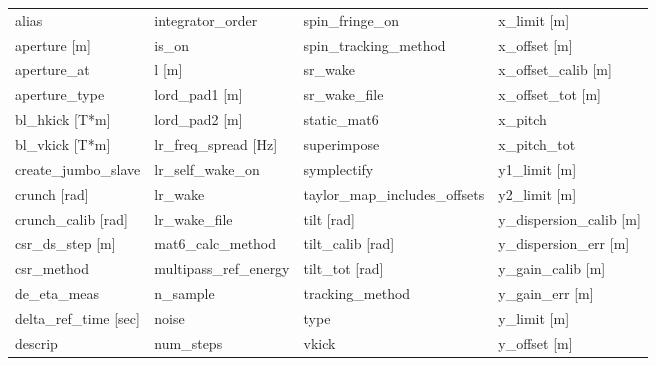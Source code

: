  \begin{tabular}{llll} \toprule
alias                            & integrator_order                 & spin_fringe_on                   & x_limit [m]                      \\
aperture [m]                     & is_on                            & spin_tracking_method             & x_offset [m]                     \\
aperture_at                      & l [m]                            & sr_wake                          & x_offset_calib [m]               \\
aperture_type                    & lord_pad1 [m]                    & sr_wake_file                     & x_offset_tot [m]                 \\
bl_hkick [T*m]                   & lord_pad2 [m]                    & static_mat6                      & x_pitch                          \\
bl_vkick [T*m]                   & lr_freq_spread [Hz]              & superimpose                      & x_pitch_tot                      \\
create_jumbo_slave               & lr_self_wake_on                  & symplectify                      & y1_limit [m]                     \\
crunch [rad]                     & lr_wake                          & taylor_map_includes_offsets      & y2_limit [m]                     \\
crunch_calib [rad]               & lr_wake_file                     & tilt [rad]                       & y_dispersion_calib [m]           \\
csr_ds_step [m]                  & mat6_calc_method                 & tilt_calib [rad]                 & y_dispersion_err [m]             \\
csr_method                       & multipass_ref_energy             & tilt_tot [rad]                   & y_gain_calib [m]                 \\
de_eta_meas                      & n_sample                         & tracking_method                  & y_gain_err [m]                   \\
delta_ref_time [sec]             & noise                            & type                             & y_limit [m]                      \\
descrip                          & num_steps                        & vkick                            & y_offset [m]                     \\

\end{tabular}
